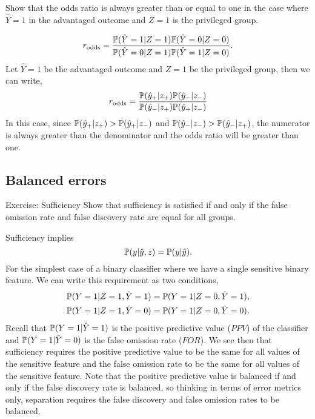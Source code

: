 \begin{lookbox}
Show that the odds ratio is always greater than or equal to one in the case where $\hat{Y}=1$ in the advantaged outcome and $Z=1$ is the privileged group.
\end{lookbox}

\[
r_{\text{odds}}
= \frac{\mathbb{P}(\hat{Y}=1 | Z=1)\mathbb{P}(\hat{Y}=0 | Z=0)}
       {\mathbb{P}(\hat{Y}=0 | Z=1)\mathbb{P}(\hat{Y}=1 | Z=0)}.
\]
Let $\hat{Y}=1$ be the advantaged outcome and $Z=1$ be the privileged group, then we can write,
\[
r_{\text{odds}} = \frac{\mathbb{P}(\hat{y}_+ | z_+)\mathbb{P}(\hat{y}_- | z_-)}
                       {\mathbb{P}(\hat{y}_- | z_+)\mathbb{P}(\hat{y}_+ | z_-)}
\]
In this case, since $\mathbb{P}(\hat{y}_+ | z_+)>\mathbb{P}(\hat{y}_+ | z_-)$ and $\mathbb{P}(\hat{y}_- | z_-)>\mathbb{P}(\hat{y}_- | z_+)$, the numerator is always greater than the denominator and the odds ratio will be greater than one.

\subsection{Balanced errors}

\begin{lookbox}{Exercise: Sufficiency}
Show that sufficiency is satisfied if and only if the false omission rate and false discovery rate are equal for all groups.
\end{lookbox}

Sufficiency implies
\[
\mathbb{P}(y|\hat{y}, z) = \mathbb{P}(y|\hat{y}).
\]
For the simplest case of a binary classifier where we have a single sensitive binary feature. We can write this requirement as two conditions,
\begin{align*}
\mathbb{P}(Y=1 | Z=1, \hat{Y}=1) & = \mathbb{P}(Y=1 | Z=0, \hat{Y}=1), \\
\mathbb{P}(Y=1 | Z=1, \hat{Y}=0) & = \mathbb{P}(Y=1 | Z=0, \hat{Y}=0).
\end{align*}
Recall that $\mathbb{P}(Y=1 | \hat{Y}=1)$ is the positive predictive value ($PPV$) of the classifier and $\mathbb{P}(Y=1 | \hat{Y}=0)$ is the false omission rate ($FOR$). We see then that sufficiency requires the positive predictive value to be the same for all values of the sensitive feature and the false omission rate to be the same for all values of the sensitive feature. Note that the positive predictive value is balanced if and only if the false discovery rate is balanced, so thinking in terms of error metrics only, separation requires the false discovery and false omission rates to be balanced.

